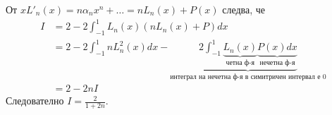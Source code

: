\documentclass[12pt]{article}
\begin{document}
        От $xL'_n(x)= n\alpha_nx^n+\ldots = nL_n(x) + P(x)$ следва, че
        \begin{align*}
               I&= 2 - 2\int_{-1}^{1}L_n(x)(nL_n(x) + P)dx\\
                &= 2 - 2\int_{-1}^{1}nL_n^2(x)dx - \underbrace{2\int_{-1}^{1}\underbrace{L_n(x)}_{\text{четна ф-я}}\underbrace{P(x)dx}_{\text{нечетна ф-я}}}_{\text{интеграл на нечетна ф-я в симитричен интервал е 0}}\\
                &= 2 - 2nI
        \end{align*}
        Следователно $\boxed{I = \frac{2}{1+2n}}$.
\end{document}
